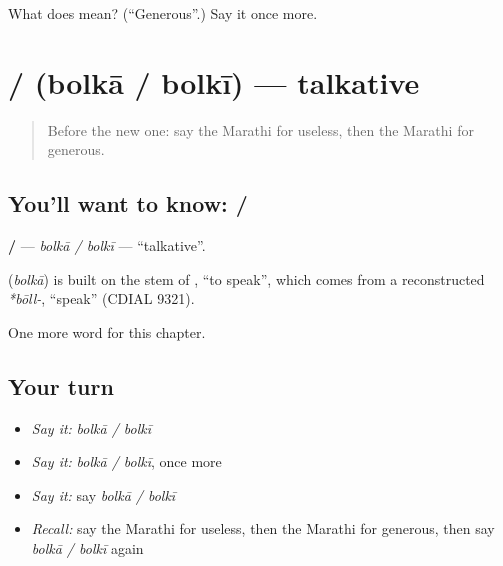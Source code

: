 \begin{tcolorbox}[breakable,colback=teal!4,colframe=teal!35!black,title={Before you move on}]
What does  mean? (\textquotedblleft{}Generous\textquotedblright{}.) Say it once more.
\end{tcolorbox}
\section[\texorpdfstring{\mr{बोलका} / \mr{बोलकी} (bolkā / bolkī)}{बोलका / बोलकी (bolkā / bolkī)}]{ /  (bolkā / bolkī) — talkative}

\label{lesson:MR-C260-bolka}



\begin{quote}
Before the new one: say the Marathi for useless, then the Marathi for generous.
\end{quote}

\subsection*{You'll want to know:  / }
\textbf{ / } — \emph{bolkā / bolkī} — \textquotedblleft{}talkative\textquotedblright{}.

\begin{cousinweb}
\textbf{} (\emph{bolkā}) is built on the stem of \textbf{}, \textquotedblleft{}to speak\textquotedblright{}, which comes from a reconstructed \emph{*bōll-}, \textquotedblleft{}speak\textquotedblright{} (CDIAL 9321).
\end{cousinweb}

\begin{grammarlens}[title={What you've built}]
One more word for this chapter.
\end{grammarlens}

\subsection*{Your turn}
\begin{itemize}
\raggedright
  \item \emph{Say it:} \emph{bolkā / bolkī}
  \item \emph{Say it:} \emph{bolkā / bolkī}, once more
  \item \emph{Say it:} say \emph{bolkā / bolkī}
  \item \emph{Recall:} say the Marathi for useless, then the Marathi for generous, then say \emph{bolkā / bolkī} again
\end{itemize}

